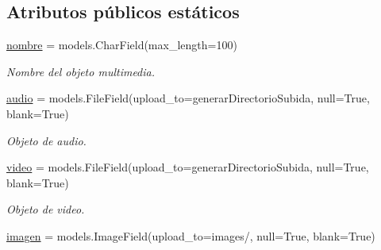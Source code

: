 \subsection*{Atributos públicos estáticos}
\begin{DoxyCompactItemize}
\item 
\hyperlink{classappEmotionIOT_1_1models_1_1Multimedia_a983b5be8544218dbd1d0f0fda8fe15ce}{nombre} = models.\+Char\+Field(max\+\_\+length=100)\hypertarget{classappEmotionIOT_1_1models_1_1Multimedia_a983b5be8544218dbd1d0f0fda8fe15ce}{}\label{classappEmotionIOT_1_1models_1_1Multimedia_a983b5be8544218dbd1d0f0fda8fe15ce}

\begin{DoxyCompactList}\small\item\em Nombre del objeto multimedia. \end{DoxyCompactList}\item 
\hyperlink{classappEmotionIOT_1_1models_1_1Multimedia_a9c9c153deb77e1c3d8c2bcc8022c0a73}{audio} = models.\+File\+Field(upload\+\_\+to=generar\+Directorio\+Subida, null=True, blank=True)\hypertarget{classappEmotionIOT_1_1models_1_1Multimedia_a9c9c153deb77e1c3d8c2bcc8022c0a73}{}\label{classappEmotionIOT_1_1models_1_1Multimedia_a9c9c153deb77e1c3d8c2bcc8022c0a73}

\begin{DoxyCompactList}\small\item\em Objeto de audio. \end{DoxyCompactList}\item 
\hyperlink{classappEmotionIOT_1_1models_1_1Multimedia_ad7f63372ebad026b2e927c60441ab5d2}{video} = models.\+File\+Field(upload\+\_\+to=generar\+Directorio\+Subida, null=True, blank=True)\hypertarget{classappEmotionIOT_1_1models_1_1Multimedia_ad7f63372ebad026b2e927c60441ab5d2}{}\label{classappEmotionIOT_1_1models_1_1Multimedia_ad7f63372ebad026b2e927c60441ab5d2}

\begin{DoxyCompactList}\small\item\em Objeto de video. \end{DoxyCompactList}\item 
\hyperlink{classappEmotionIOT_1_1models_1_1Multimedia_a79d035ea01cf4cc8049c3eedce2f6ff9}{imagen} = models.\+Image\+Field(upload\+\_\+to=\textquotesingle{}images/\textquotesingle{}, null=True, blank=True)\hypertarget{classappEmotionIOT_1_1models_1_1Multimedia_a79d035ea01cf4cc8049c3eedce2f6ff9}{}\label{classappEmotionIOT_1_1models_1_1Multimedia_a79d035ea01cf4cc8049c3eedce2f6ff9}


\end{DoxyCompactItemize}
